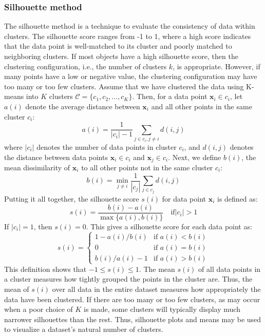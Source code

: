 \documentclass{article}[11pt]
\begin{document}
\subsubsection*{Silhouette method}
The silhouette method is a technique to evaluate the consistency of data within clusters.
The silhouette score ranges from -1 to 1, where a high score indicates that the data point is well-matched to its cluster and poorly matched to neighboring clusters.
If most objects have a high silhouette score, then the clustering configuration, i.e., the number of clusters $k$, is appropriate. 
However, if many points have a low or negative value, the clustering configuration may have too many or too few clusters.
Assume that we have clustered the data using K-means into $K$ clusters $\mathcal{C} = \{c_1, c_2, \ldots, c_K\}$.
Then, for a data point $\mathbf{x}_i\in c_i$, let $a(i)$ denote the average distance between $\mathbf{x}_i$ and all other points in the same cluster $c_i$:
\begin{equation}
a(i) = \frac{1}{|c_i| - 1}\sum_{j\in c_i, j\neq i}d(i,j)
\end{equation}
where $|c_i|$ denotes the number of data points in cluster $c_i$, and $d(i,j)$ denotes the distance between data points $\mathbf{x}_i\in{c_{i}}$ and $\mathbf{x}_j\in{c_{i}}$.
Next, we define $b(i)$, the mean dissimilarity of $\mathbf{x}_i$ to all other points not in the same cluster $c_i$:
\begin{equation}
b(i) = \min_{j\neq i}\frac{1}{|c_j|}\sum_{j\in c_j}d(i,j)
\end{equation}
Putting it all together, the silhouette score $s(i)$ for data point $\mathbf{x}_i$ is defined as:
\begin{equation}
s(i) = \frac{b(i) - a(i)}{\max\{a(i), b(i)\}}\quad\text{if}|c_i|>1
\end{equation}
If $|c_i|=1$, then $s(i)=0$. This gives a silhouette score for each data point as:
\begin{equation}
   s(i) =
   \begin{cases}
      1 - a(i)/b(i) & \text{if } a(i) < b(i)\\ 
      0 & \text{if } a(i) = b(i)\\
      b(i)/a(i) - 1 & \text{if } a(i) > b(i)
   \end{cases}
\end{equation}
This definition shows that $-1\leq s(i)\leq 1$. 
The mean $s(i)$ of all data points in a cluster measures how tightly grouped the points in the cluster are.
Thus, the mean of $s(i)$ over all data in the entire dataset measures how appropriately the data have been clustered.
If there are too many or too few clusters, as may occur when a poor choice of $K$ is made, some clusters will typically display much narrower silhouettes than the rest. 
Thus, silhouette plots and means may be used to visualize a dataset's natural number of clusters.
\end{document}
